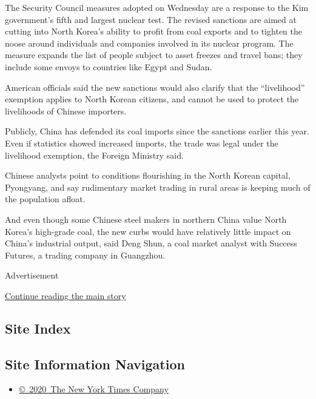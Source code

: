 The Security Council measures adopted on Wednesday are a response to the
Kim government's fifth and largest nuclear test. The revised sanctions
are aimed at cutting into North Korea's ability to profit from coal
exports and to tighten the noose around individuals and companies
involved in its nuclear program. The measure expands the list of people
subject to asset freezes and travel bans; they include some envoys to
countries like Egypt and Sudan.

American officials said the new sanctions would also clarify that the
``livelihood'' exemption applies to North Korean citizens, and cannot be
used to protect the livelihoods of Chinese importers.

Publicly, China has defended its coal imports since the sanctions
earlier this year. Even if statistics showed increased imports, the
trade was legal under the livelihood exemption, the Foreign Ministry
said.

Chinese analysts point to conditions flourishing in the North Korean
capital, Pyongyang, and say rudimentary market trading in rural areas is
keeping much of the population afloat.

And even though some Chinese steel makers in northern China value North
Korea's high-grade coal, the new curbs would have relatively little
impact on China's industrial output, said Deng Shun, a coal market
analyst with Success Futures, a trading company in Guangzhou.

Advertisement

\protect\hyperlink{after-bottom}{Continue reading the main story}

\hypertarget{site-index}{%
\subsection{Site Index}\label{site-index}}

\hypertarget{site-information-navigation}{%
\subsection{Site Information
Navigation}\label{site-information-navigation}}

\begin{itemize}
\tightlist
\item
  \href{https://help.nytimes3xbfgragh.onion/hc/en-us/articles/115014792127-Copyright-notice}{©~2020~The
  New York Times Company}
\end{itemize}

